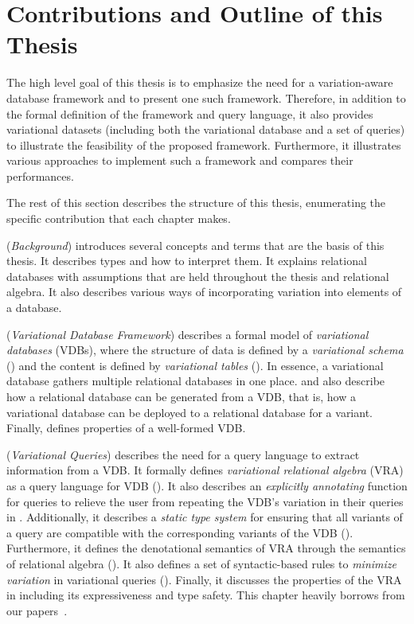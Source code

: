 \section{Contributions and Outline of this Thesis}
\label{sec:contribution}

The high level goal of this thesis is to emphasize the need for a variation-aware database
framework and to present one such framework. Therefore, in addition to the formal 
definition of the framework and query language, it also provides variational datasets 
(including both the variational database and a set of queries) to illustrate the feasibility
of the proposed framework. Furthermore, it illustrates various approaches to implement
such a framework and compares their performances.

The rest of this section describes the structure of this thesis, enumerating the specific 
contribution that each chapter makes. 

 (\emph{Background}) introduces several concepts and terms that are the 
basis of this thesis. It describes types and how to interpret them. It explains relational
databases with assumptions that are held throughout the thesis and relational algebra. 
It also describes various ways of incorporating variation
into elements of a database. 

 (\emph{Variational Database Framework}) describes a formal model of
\emph{variational databases} (VDBs), where the structure of data
is defined by a \emph{variational schema} () and the content is defined
by \emph{variational tables} ().
In essence, a variational database gathers multiple relational databases in one place.
 and  also describe how a relational database can be generated
from a VDB, that is, how a variational database can be deployed to a relational database for a variant.
Finally,  defines properties of a well-formed VDB.

 (\emph{Variational Queries}) describes the need for a query language 
to extract information from a VDB. It formally defines 
\emph{variational relational algebra} (VRA) as a query language for
VDB ().
%
It also describes an \emph{explicitly annotating}  function for queries to relieve the 
user from repeating the VDB's variation in their queries in .
%
Additionally, it describes a \emph{static type system} for ensuring that all variants of a query are
compatible with the corresponding variants of the VDB ().
% 
Furthermore, it defines the denotational semantics of VRA through the semantics of
relational algebra ().
%
It also defines a set of syntactic-based rules to \emph{minimize variation} in 
variational queries ().
%
Finally, it discusses the properties of the VRA in  including its expressiveness and 
type safety. 
%
This chapter heavily borrows from our papers~\cite{ATW17dbpl, ATW18poly, vldbArXiv}.

